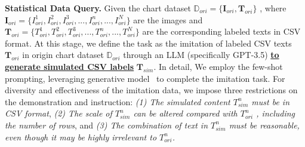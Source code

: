 \documentclass{article} \usepackage{iclr2024_conference,times}
\begin{document}
\noindent\textbf{Statistical Data Query.} 
Given the chart dataset {\small $\mathbb{D}_{ori}=\{\mathbf{I}_{ori},\mathbf{T}_{ori}\}$ }, where {\small $\mathbf{I}_{ori}=\{I_{ori}^1,I_{ori}^2,I_{ori}^3,...,I_{ori}^n,...,I_{ori}^N\}$ } are the images and {\small $\mathbf{T}_{ori}=\{T_{ori}^1,T_{ori}^2,T_{ori}^3,...,T_{ori}^n,...,T_{ori}^N\}$ } are the corresponding labeled texts in CSV format. At this stage, we define the task as the imitation of labeled CSV texts {\small $\mathbf{T}_{ori}$ } in origin chart dataset $\mathbb{D}_{ori}$ through an LLM (specifically GPT-3.5) \underline{\textbf{to generate simulated CSV labels}} {\small $\mathbf{T}_{sim}$}. In detail, We employ the few-shot prompting, leveraging generative model~\citep{Brown2020gpt} to complete the imitation task. For diversity and effectiveness of the imitation data, we impose three restrictions on the demonstration and instruction: \textit{(1) The simulated content {\small $T_{sim}^n$ } must be in CSV format}, \textit{(2) The scale of {\small $T_{sim}^n$ } can be altered compared with {\small $T_{ori}^n$ }, including the number of rows}, and \textit{(3) The combination of text in {\small $T_{sim}^n$ } must be reasonable, even though it may be highly irrelevant to {\small $T_{ori}^n$.}}
\end{document}
